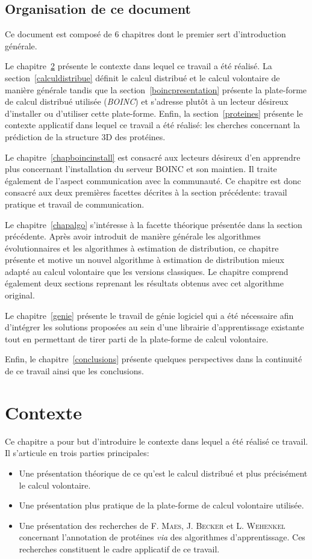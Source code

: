 \documentclass[a4paper, 12pt]{report}
\begin{document}
\section{Organisation de ce document}
Ce document est composé de 6 chapitres dont le premier sert d'introduction générale.

Le chapitre~\ref{chapcontexte} présente le contexte dans lequel ce travail a été réalisé. La section~\ref{calculdistribue} définit le calcul distribué et le calcul volontaire de manière générale tandis que la section~\ref{boincpresentation} présente la plate-forme de calcul distribué utilisée (\textit{BOINC}) et s'adresse plutôt à un lecteur désireux d'installer ou d'utiliser cette plate-forme. Enfin, la section~\ref{proteines} présente le contexte applicatif dans lequel ce travail a été réalisé: les cherches concernant la prédiction de la structure 3D des protéines.

Le chapitre~\ref{chapboincinstall} est consacré aux lecteurs désireux d'en apprendre plus concernant l'installation du serveur \textsc{BOINC} et son maintien. Il traite également de l'aspect communication avec la communauté. Ce chapitre est donc consacré aux deux premières facettes décrites à la section précédente: travail pratique et travail de communication. 

Le chapitre~\ref{chapalgo} s'intéresse à la facette théorique présentée dans la section précédente. Après avoir introduit de manière générale les algorithmes évolutionnaires et les algorithmes à estimation de distribution, ce chapitre présente et motive un nouvel algorithme à estimation de distribution mieux adapté au calcul volontaire que les versions classiques. Le chapitre comprend également deux sections reprenant les résultats obtenus avec cet algorithme original.

Le chapitre~\ref{genie} présente le travail de génie logiciel qui a été nécessaire afin d'intégrer les solutions proposées au sein d'une librairie d'apprentissage existante tout en permettant de tirer parti de la plate-forme de calcul volontaire.

Enfin, le chapitre~\ref{conclusions} présente quelques perspectives dans la continuité de ce travail ainsi que les conclusions.

\chapter{Contexte}
\label{chapcontexte}

Ce chapitre a pour but d'introduire le contexte dans lequel a été réalisé ce travail. Il s'articule en trois parties principales:
\begin{itemize}
\item Une présentation théorique de ce qu'est le calcul distribué et plus précisément le calcul volontaire.
\item Une présentation plus pratique de la plate-forme de calcul volontaire utilisée.
\item Une présentation des recherches de F. \textsc{Maes}, J. \textsc{Becker} et L. \textsc{Wehenkel} concernant l'annotation de protéines \textit{via} des algorithmes d'apprentissage. Ces recherches constituent le cadre applicatif de ce travail.
\end{itemize}
\end{document}
